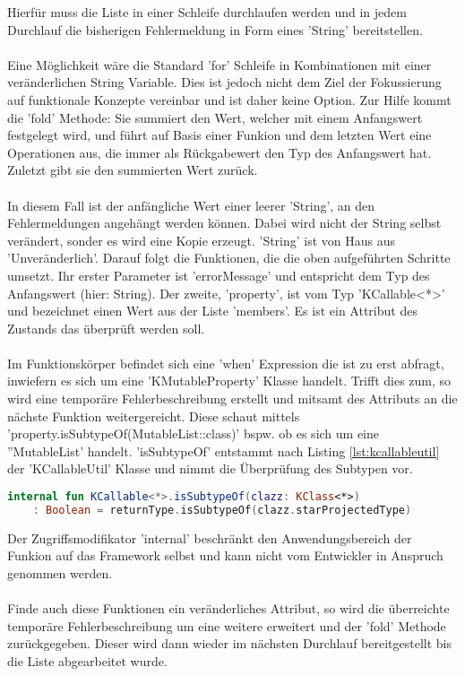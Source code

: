 Hierfür muss die Liste in einer Schleife durchlaufen werden und in jedem Durchlauf die bisherigen Fehlermeldung in Form eines 'String' bereitstellen. 
\\\\
Eine Möglichkeit wäre die Standard 'for' Schleife in Kombinationen mit einer veränderlichen String Variable. Dies ist jedoch nicht dem Ziel der Fokussierung auf funktionale Konzepte vereinbar und ist daher keine Option. Zur Hilfe kommt die 'fold' Methode: Sie summiert den Wert, welcher mit einem Anfangswert festgelegt wird, und führt auf Basis einer Funkion und dem letzten Wert eine Operationen aus, die immer als Rückgabewert den Typ des Anfangswert hat. Zuletzt gibt sie den summierten Wert zurück.
\\\\
In diesem Fall ist der anfängliche Wert einer leerer 'String', an den Fehlermeldungen angehängt werden können. Dabei wird nicht der String selbst verändert, sonder es wird eine Kopie erzeugt. 'String' ist von Haus aus 'Unveränderlich'. Darauf folgt die Funktionen, die die oben aufgeführten Schritte umsetzt. Ihr erster Parameter ist 'errorMessage' und entspricht dem Typ des Anfangswert (hier: String). Der zweite, 'property', ist vom Typ 'KCallable<*>' und bezeichnet einen Wert aus der Liste 'members'. Es ist ein Attribut des Zustands das überprüft werden soll.
\\\\
Im Funktionskörper befindet sich eine 'when' Expression die ist zu erst abfragt, inwiefern es sich um eine 'KMutableProperty' Klasse handelt. Trifft dies zum, so wird eine temporäre Fehlerbeschreibung erstellt und mitsamt des Attributs an die nächste Funktion weitergereicht. Diese schaut mittels 'property.isSubtypeOf(MutableList::class)' bspw. ob es sich um eine ''MutableList' handelt. 'isSubtypeOf' entstammt nach Listing
\ref{lst:kcallableutil}
der 'KCallableUtil' Klasse und nimmt die Überprüfung des Subtypen vor.
\begin{lstlisting}[caption={KCallableUti}, label={lst:kcallableutil}, language=Kotlin]
internal fun KCallable<*>.isSubtypeOf(clazz: KClass<*>)
	: Boolean = returnType.isSubtypeOf(clazz.starProjectedType)
\end{lstlisting}
\bigskip
Der Zugriffsmodifikator 'internal' beschränkt den Anwendungsbereich der Funkion auf das Framework selbst und kann nicht vom Entwickler in Anspruch genommen werden.
\\\\
Finde auch diese Funktionen ein veränderliches Attribut, so wird die überreichte temporäre Fehlerbeschreibung um eine weitere erweitert und der 'fold' Methode zurückgegeben. Dieser wird dann wieder im nächsten Durchlauf bereitgestellt bis die Liste abgearbeitet wurde.
